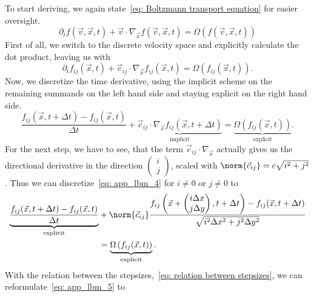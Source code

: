 To start deriving, we again state~\eqref{eq: Boltzmann transport equation} for easier oversight.
\begin{equation}
  \label{eq: app_lbm_2}
  \partial_t f(\vec{v},\vec{x},t) + \vec{v} \cdot \nabla_{\vec{x}} f(\vec{v},\vec{x},t) = \Omega\left(f(\vec{v},\vec{x},t)\right)
\end{equation}
First of all, we switch to the discrete velocity space and explicitly calculate the dot product, leaving us with
\begin{equation}
  \label{eq: app_lbm_3}
  \partial_t f_{ij}(\vec{x},t) + \vec{c}_{ij} \cdot \nabla_{\vec{x}} f_{ij}(\vec{x},t) = \Omega\left(f_{ij}(\vec{x},t)\right).
\end{equation}
Now, we discretize the time derivative, using the implicit scheme on the remaining summands on the left hand side and staying explicit on the right hand side.
\begin{equation}
  \label{eq: app_lbm_4}
  \frac{f_{ij}(\vec{x}, t+\Delta t) - f_{ij}(\vec{x}, t)}{\Delta t}
  +
  \underbrace {\vec{c}_{ij} \cdot \nabla_{\vec{x}} f_{ij}(\vec{x},t+\Delta t)
  }_{\text{implicit}}
   = \underbrace{\Omega\left(f_{ij}(\vec{x},t)\right)}_{\text{explicit}}.
\end{equation}
For the next step, we have to see, that the term $\vec{c}_{ij} \cdot \nabla_{\vec{x}}$ actually gives us the directional derivative in the direction $\begin{pmatrix}i\\j\end{pmatrix}$, scaled with $\norm{\vec{c}_{ij}}= c\sqrt{i^2 + j^2}$.
Thus we can discretize~\eqref{eq: app_lbm_4} for $i\neq 0$ or $j\neq 0$ to
\begin{equation}
  \label{eq: app_lbm_5}
  \begin{aligned}
    \underbrace{\frac{f_{ij}(\vec{x}, t+\Delta t) - f_{ij}(\vec{x}, t)}{\Delta t}}_{\text{explicit}}
    & + \norm{\vec{c}_{ij}}\frac{f_{ij}\left(\vec{x}+\begin{pmatrix}i\Delta x\\j\Delta y\end{pmatrix}, t+\Delta t\right) - f_{ij}(\vec{x}, t+\Delta t)}{\sqrt{i^2\Delta x^2 + j^2\Delta y^2}}
    \\&
    = \underbrace{\Omega\left(f_{ij}(\vec{x},t)\right)}_{\text{explicit}}.
  \end{aligned}
\end{equation}
With the relation between the stepsizes,~\eqref{eq: relation between stepsizes}, we can reformulate~\eqref{eq: app_lbm_5} to
